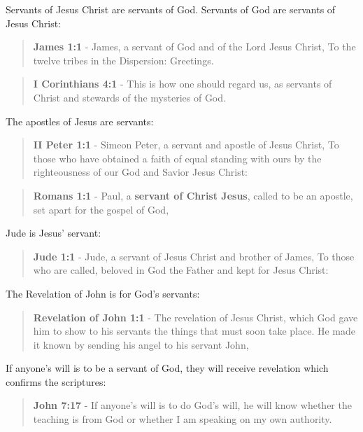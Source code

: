 \documentclass[11pt]{article}
\begin{document}
Servants of Jesus Christ are servants of God. Servants of God are servants of Jesus Christ:

\begin{quote}
\textbf{James 1:1} - James, a servant of God and of the Lord Jesus Christ, To the twelve tribes in the Dispersion: Greetings.
\end{quote}

\begin{quote}
\textbf{I Corinthians 4:1} - This is how one should regard us, as servants of Christ and stewards of the mysteries of God.
\end{quote}

The apostles of Jesus are servants:

\begin{quote}
\textbf{II Peter 1:1} - Simeon Peter, a servant and apostle of Jesus Christ, To those who have obtained a faith of equal standing with ours by the righteousness of our God and Savior Jesus Christ:
\end{quote}

\begin{quote}
\textbf{Romans 1:1} - Paul, a \textbf{servant of Christ Jesus}, called to be an apostle, set apart for the gospel of God,
\end{quote}

Jude is Jesus' servant:

\begin{quote}
\textbf{Jude 1:1} - Jude, a servant of Jesus Christ and brother of James, To those who are called, beloved in God the Father and kept for Jesus Christ:
\end{quote}

The Revelation of John is for God's servants:

\begin{quote}
\textbf{Revelation of John 1:1} - The revelation of Jesus Christ, which God gave him to show to his servants the things that must soon take place. He made it known by sending his angel to his servant John,
\end{quote}

If anyone's will is to be a servant of God, they will receive revelation which confirms the scriptures:

\begin{quote}
\textbf{John 7:17} - If anyone's will is to do God's will, he will know whether the teaching is from God or whether I am speaking on my own authority.
\end{quote}
\end{document}
